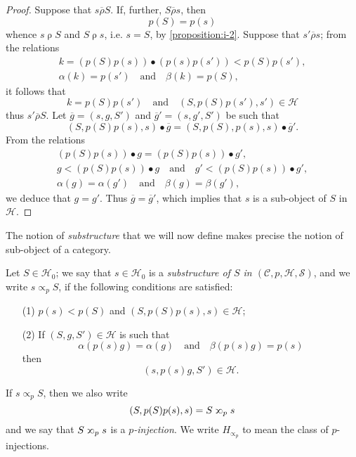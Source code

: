 \documentclass[a4paper,fleqn]{article}
\theoremstyle{plain}
\theoremstyle{definition}
\newenvironment{definition}[1]
  {\renewcommand\theinnerdefinition{#1}\innerdefinition}
  {\endinnerdefinition}
\newcommand{\oldpage}[1]{{\marginpar{\footnotesize$\bigg\vert$\,\,\,\,\textit{p.~#1}}}}
\newcommand{\textand}{\quad\text{and}\quad}
\newcommand{\CC}{\mathcal{C}}
\newcommand{\HH}{\mathcal{H}}
\renewcommand{\SS}{\mathcal{S}}
\newcommand{\relrho}{\mathrel{\rho}}
\newcommand{\relrhobar}{\mathrel{\overline{\rho}}}
\newcommand{\subs}{\mathrel{\propto}}
\newcommand{\sups}{\mathrel{\reflectbox{$\propto$}}}
\newcommand{\smallbullet}{\bullet}
\begin{document}
\begin{proof}
  Suppose that $s\relrhobar S$.
  If, further, $S\relrhobar s$, then
  \[
    p(S)=p(s)
  \]
  whence $s\relrho S$ and $S\relrho s$, i.e. $s=S$, by \cref{proposition:i-2}.
  Suppose that $s'\relrhobar s$;
  from the relations
  \[
    \begin{gathered}
      k = (p(S)p(s))\smallbullet(p(s)p(s'))
      < p(S)p(s'),
    \\\alpha(k)=p(s')
      \textand
      \beta(k)=p(S),
    \end{gathered}
  \]
  it follows that
  \[
    k=p(S)p(s')
    \textand
    (S,p(S)p(s'),s')\in\HH
  \]
  thus $s'\relrhobar S$.
  \oldpage{360}
  Let $\overline{g}=(s,g,S')$ and $\overline{g}'=(s,g',S')$ be such that
  \[
    (S,p(S)p(s),s)\smallbullet\overline{g}
    = (S,p(S),p(s),s)\smallbullet\overline{g}'.
  \]
  From the relations
  \[
    \begin{gathered}
      (p(S)p(s))\smallbullet g = (p(S)p(s))\smallbullet g',
    \\g < (p(S)p(s))\smallbullet g
      \textand
      g' < (p(S)p(s))\smallbullet g',
    \\\alpha(g)=\alpha(g')
      \textand
      \beta(g)=\beta(g'),
    \end{gathered}
  \]
  we deduce that $g=g'$.
  Thus $\overline{g}=\overline{g}'$, which implies that $s$ is a sub-object of $S$ in $\HH$.
\end{proof}

The notion of \emph{substructure} that we will now define makes precise the notion of sub-object of a category.

\begin{definition}{7}
\label{definition:i-7}
  Let $S\in\HH_0$;
  we say that $s\in\HH_0$ is a \emph{substructure of $S$ in $(\CC,p,\HH,\SS)$}, and we write $s\subs_p S$, if the following conditions are satisfied:
  \begin{enumerate}
    \item[\normalfont(1)]
      $p(s)<p(S)$ and $(S,p(S)p(s),s)\in\HH$;
    \item[\normalfont(2)]
      If $(S,g,S')\in\HH$ is such that
      \[
        \alpha(p(s)g)=\alpha(g)
        \textand
        \beta(p(s)g)=p(s)
      \]
      then
      \[
        (s,p(s)g,S')\in\HH.
      \]
  \end{enumerate}
  If $s\subs_pS$, then we also write
  \[
    (S,p(S)p(s),s)
    = S\sups_p s
  \]
  and we say that $S\sups_p s$ is a \emph{$p$-injection}.
  We write $H_{\subs_p}$ to mean the class of $p$-injections.
\end{definition}
\end{document}
